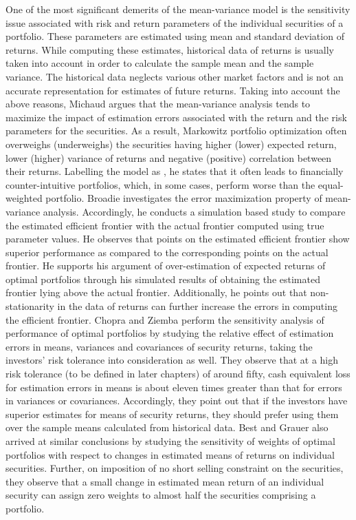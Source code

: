 \documentclass[a4paper,12pt,twoside]{article}
\begin{document}
One of the most significant demerits of the mean-variance model is the sensitivity issue associated with risk and return parameters of the individual securities of a portfolio. These parameters are estimated using mean and standard deviation of returns. While computing these estimates, historical data of returns is usually taken into account in order to calculate the sample mean and the sample variance. The historical data neglects various other market factors and is not an accurate representation for estimates of future returns. Taking into account the above reasons, Michaud \cite{Michaud} argues that the mean-variance analysis tends to maximize the impact of estimation errors associated with the return and the risk parameters for the securities. As a result, Markowitz portfolio optimization often overweighs (underweighs) the securities having higher (lower) expected return, lower (higher) variance of returns and negative (positive) correlation between their returns. Labelling the model as , he states that it often leads to financially counter-intuitive portfolios, which, in some cases, perform worse than the equal-weighted portfolio. Broadie \cite{Broadie} investigates the error maximization property of mean-variance analysis. Accordingly, he conducts a simulation based study to compare the estimated efficient frontier with the actual frontier computed using true parameter values. He observes that points on the estimated efficient frontier show superior performance as compared to the corresponding points on the actual frontier. He supports his argument of over-estimation of expected returns of optimal portfolios through his simulated results of obtaining the estimated frontier lying above the actual frontier. Additionally, he points out that non-stationarity in the data of returns can further increase the errors in computing the efficient frontier. Chopra and Ziemba \cite{Chopra} perform the sensitivity analysis of performance of optimal portfolios by studying the relative effect of estimation errors in means, variances and covariances of security returns, taking the investors' risk tolerance into consideration as well. They observe that at a high risk tolerance (to be defined in later chapters) of around fifty, cash equivalent loss for estimation errors in means is about eleven times greater than that for errors in variances or covariances. Accordingly, they point out that if the investors have superior estimates for means of security returns, they should prefer using them over the sample means calculated from historical data. Best and Grauer \cite{Best1,Best2} also arrived at similar conclusions by studying the sensitivity of weights of optimal portfolios with respect to changes in estimated means of returns on individual securities. Further, on imposition of no short selling constraint on the securities, they observe that a small change in estimated mean return of an individual security can assign zero weights to almost half the securities comprising a portfolio.\\
\end{document}
